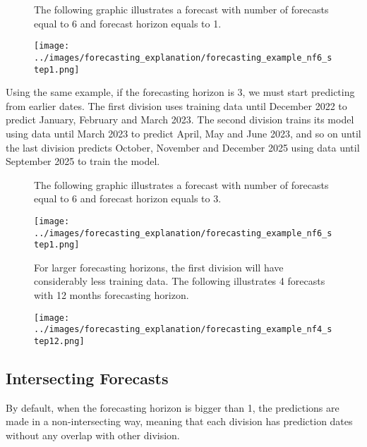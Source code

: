 \begin{figure}[H]
The following graphic illustrates a forecast with number of forecasts equal to 6 and forecast horizon equals to 1.

    \begin{center}
        \texttt{[image: ../images/forecasting\_explanation/forecasting\_example\_nf6\_step1.png]}
    \end{center}
\end{figure}

Using the same example, if the forecasting horizon is 3, we must start predicting from earlier dates. The first division uses training data until December 2022 to predict January, February and March 2023. The second division trains its model using data until March 2023 to predict April, May and June 2023, and so on until the last division predicts October, November and December 2025 using data until September 2025 to train the model.

\begin{figure}[H]
The following graphic illustrates a forecast with number of forecasts equal to 6 and forecast horizon equals to 3.

    \begin{center}
        \texttt{[image: ../images/forecasting\_explanation/forecasting\_example\_nf6\_step1.png]}
    \end{center}
\end{figure}

\begin{figure}[H]
For larger forecasting horizons, the first division will have considerably less training data. The following illustrates 4 forecasts with 12 months forecasting horizon.

    \begin{center}
        \texttt{[image: ../images/forecasting\_explanation/forecasting\_example\_nf4\_step12.png]}
    \end{center}
\end{figure}

\subsection{Intersecting Forecasts}

By default, when the forecasting horizon is bigger than 1, the predictions are made in a non-intersecting way, meaning that each division has prediction dates without any overlap with other division.

